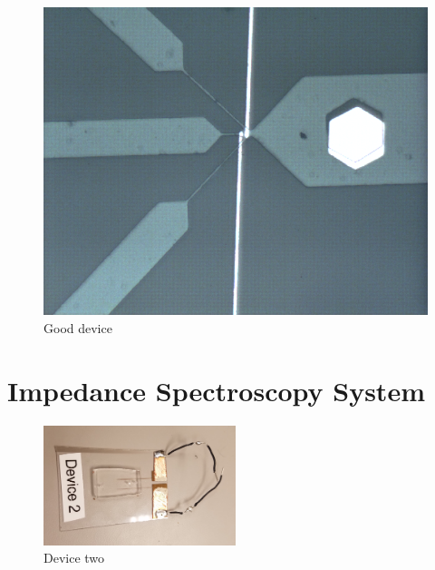 \begin{figure}[h]
    \centering
    \includegraphics[width=\textwidth]{images/good_device.png}
    \caption{Good device}
    \label{fig:good_device}
\end{figure}

\FloatBarrier

\section{Impedance Spectroscopy System}

\begin{figure}[h]
    \centering
    \includegraphics[width=0.5\textwidth]{images/device_22.jpg}
    \caption{Device two}
    \label{fig:my_label}
\end{figure}

